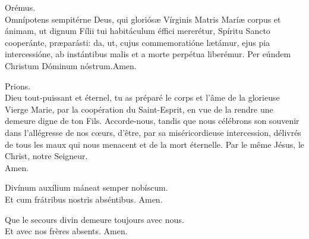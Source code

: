 \documentclass[twoside]{article}
\begin{document}
\begin{paracol}[1]{2}
Orémus.\\
Omnípotens sempitérne Deus, qui gloriósæ Vírginis Matris Maríæ corpus et ánimam, ut dignum Fílii tui habitáculum éffici mererétur, Spíritu Sancto cooperánte, præparásti: da, ut, cujus commemoratióne lætámur, ejus pia intercessióne, ab instántibus malis et a morte perpétua liberémur. Per eúndem Christum Dóminum nóstrum.\capsaut \rr Amen.

\switchcolumn

Prions. \\
Dieu tout-puissant et éternel, tu as préparé le corps et l’âme de la glorieuse Vierge Marie, par la coopération du Saint-Esprit, en vue de la rendre une demeure digne de ton Fils. Accorde-nous, tandis que nous célébrons son souvenir dans l’allégresse de nos cœurs, d’être, par sa miséricordieuse intercession, délivrés de tous les maux qui nous menacent et de la mort éternelle. Par le même Jésus, le Christ, notre Seigneur.\\
\rr Amen.

\switchcolumn*

\vv Divínum auxílium \cc máneat semper nobíscum. \\
\rr Et cum frátribus nostris abséntibus. Amen.

\switchcolumn

\vv Que le secours divin \cc demeure toujours avec nous.\\
\rr Et avec nos frères absents. Amen.

\end{paracol}
\end{document}
